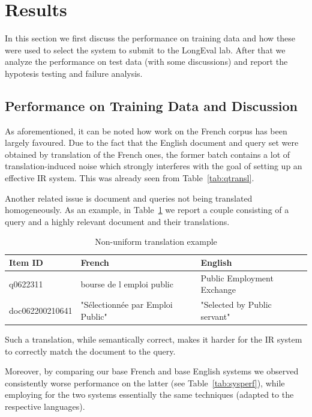 \section{Results}
\label{sec:results}



In this section we first discuss the performance on training data and how these were used to select the system to submit to the LongEval lab. After that we analyze the performance on test data (with some discussions) and report the hypotesis testing and failure analysis.



\subsection{Performance on Training Data and Discussion}
\label{subsec:performance}
As aforementioned, it can be noted how work on the French corpus has been largely favoured.
Due to the fact that the English document and query set were obtained by translation of the French ones, the former batch contains a lot of translation-induced noise which strongly interferes with the goal of setting up an effective IR system. This was already seen from Table~\ref{tab:qtransl}.

\par Another related issue is document and queries not being translated homogeneously. As an example, in Table~\ref{tab:nonuntransl} we report a couple consisting of a query and a highly relevant document and their translations.
\begin{table}[tb]
  \caption{Non-uniform translation example}
  \label{tab:nonuntransl}
  \centering
  \begin{tabular}{|l|l|l|}
    \toprule
    Item ID&French&English\\
    \midrule
    q0622311 & bourse de l emploi public & Public Employment Exchange\\
doc062200210641 & "Sélectionnée par Emploi Public" & "Selected by Public servant"\\
  \bottomrule
\end{tabular}
\end{table}
Such a translation, while semantically correct, makes it harder for the IR system to correctly match the document to the query.
\par Moreover, by comparing our base French and base English systems we observed consistently worse performance on the latter (see Table~\ref{tab:sysperf}), while employing for the two systems essentially the same techniques (adapted to the respective languages).
\par

